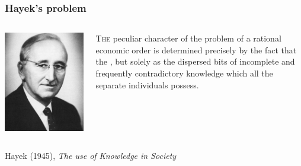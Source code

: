 \documentclass{beamer} 	%
\begin{document}
\begin{frame}[label=Hayek-quote]
\frametitle{Hayek's problem\hfilll \hyperlink{Hayek-back}{}}
\begin{block}{}
\begin{columns}
\begin{column}{0.25\textwidth}
	\includegraphics[width=\textwidth]{Hayek.jpg}
\end{column}
\begin{column}{0.7\textwidth}
\begin{myquote}
	\lettrine[findent=3.5pt,nindent=-3pt]{T}{he} peculiar character of the problem of a rational economic order
	is determined precisely by the fact that the , but solely as the dispersed bits of incomplete and
	frequently contradictory knowledge which all the separate individuals
	possess. 
\end{myquote}
\end{column}
\end{columns}
\flushright Hayek (1945), 	\emph{The use of Knowledge in Society}
\end{block}	
\end{frame}

\end{document}
